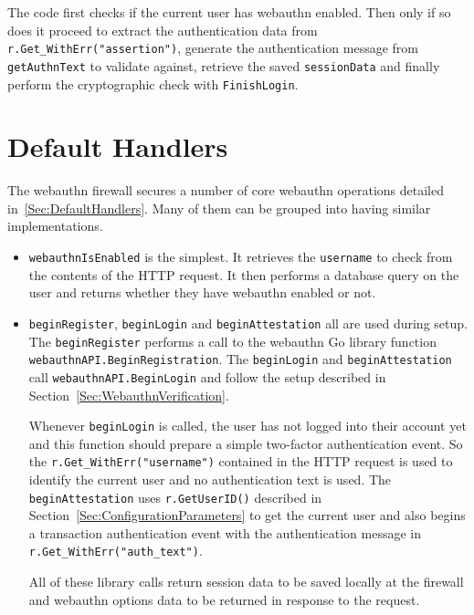 The code first checks if the current user has webauthn enabled. Then only if so does it proceed to extract the authentication data from \lstinline{r.Get_WithErr("assertion")}, generate the authentication message from \lstinline{getAuthnText} to validate against, retrieve the saved \lstinline{sessionData} and finally perform the cryptographic check with \lstinline{FinishLogin}.

\section{Default Handlers}

The webauthn firewall secures a number of core webauthn operations detailed in~\ref{Sec:DefaultHandlers}. Many of them can be grouped into having similar implementations.

\begin{itemize}[nosep]
\item \lstinline{webauthnIsEnabled} is the simplest. It retrieves the \lstinline{username} to check from the contents of the HTTP request. It then performs a database query on the user and returns whether they have webauthn enabled or not.

\item \lstinline{beginRegister}, \lstinline{beginLogin} and \lstinline{beginAttestation} all are used during setup. The \lstinline{beginRegister} performs a call to the webauthn Go library function \lstinline{webauthnAPI.BeginRegistration}. The \lstinline{beginLogin} and \lstinline{beginAttestation} call \lstinline{webauthnAPI.BeginLogin} and follow the setup described in Section~\ref{Sec:WebauthnVerification}. 

Whenever \lstinline{beginLogin} is called, the user has not logged into their account yet and this function should prepare a simple two-factor authentication event. So the \lstinline{r.Get_WithErr("username")} contained in the HTTP request is used to identify the current user and no authentication text is used. The \lstinline{beginAttestation} uses \lstinline{r.GetUserID()} described in Section~\ref{Sec:ConfigurationParameters} to get the current user and also begins a transaction authentication event with the authentication message in \lstinline{r.Get_WithErr("auth_text")}.

All of these library calls return session data to be saved locally at the firewall and webauthn options data to be returned in response to the request.


\end{itemize}
